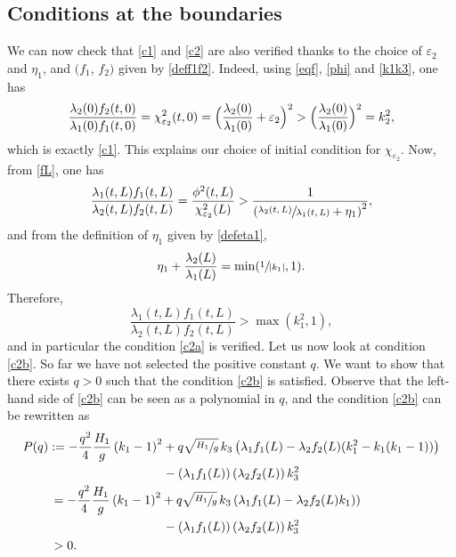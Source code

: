 \documentclass[JEP,XML,SOM,Unicode]{cedram}
\theoremstyle{definition}
\begin{document}
\subsection{Conditions at the boundaries}
We can now check that
\eqref{c1} and \eqref{c2} are also verified thanks to the choice of $\varepsilon_{2}$ and $\eta_{1}${, and $(f_{1}$, $f_{2})$ given by \eqref{deff1f2}}. Indeed, using \eqref{eqf}{, \eqref{phi}} and \eqref{k1k3}, one has
\begin{equation*}
\frac{\lambda_{2}(0)f_{2}(t,0)}{\lambda_{1}(0)f_{1}(t,0)}=\chi_{\varepsilon_{2}}^{2}(t,0)= \Bigl(\frac{\lambda_{2}(0)}{\lambda_{1}(0)}+\varepsilon_{2} \Bigr)^{2}> \Bigl(\frac{\lambda_{2}(0)}{\lambda_{1}(0)} \Bigr)^{2}=k_{2}^{2},
\end{equation*}
{which is exactly \eqref{c1}.} This explains our choice of initial condition for $\chi_{\varepsilon_{2}}$.
Now, from \eqref{fL}, one has
\begin{equation*}
\frac{\lambda_{1}(t,L)f_{1}(t,L)}{\lambda_{2}(t,L)f_{2}(t,L)}=\frac{\phi^{2}(t,L)}{\chi^{2}_{\varepsilon_{2}}(L)}>\frac{1}{\left(\sfrac{\lambda_{2}(t,L)}{\lambda_{1}(t,L)}+\eta_{1}\right)^{2}},
\end{equation*}
and from the definition of $\eta_{1}$ given by \eqref{defeta1},
\begin{equation*}
\eta_{1}+\frac{\lambda_{2}(L)}{\lambda_{1}(L)}=\min(\sfrac{1}{|k_{1}|},1).
\end{equation*}
Therefore,
\begin{equation}
\frac{\lambda_{1}(t,L)f_{1}(t,L)}{\lambda_{2}(t,L)f_{2}(t,L)}>\max(k_{1}^{2},1),
\label{cond3}
\end{equation}
and in particular
the condition \eqref{c2a} is verified. Let us now look at condition \eqref{c2b}. So far we have not selected the positive constant $q$.
We want to show that there exists $q>0$ such that the condition \eqref{c2b} is satisfied. Observe that the left-hand side of \eqref{c2b} can be seen as a polynomial in $q$,
and the condition \eqref{c2b} can be rewritten as
\begin{equation*}
\begin{split}
P(q)&:=
-\frac{q^{2}}{4}\frac{H_{1}}{g}\left(k_{1}-1\right)^{2}+q\sqrt{\sfrac{H_{1}}{g}}\,k_{3}\left(\lambda_{1}f_{1}(L)-\lambda_{2}f_{2}(L)(k_{1}^{2}-k_{1}(k_{1}-1))\right)
\\
&\hspace*{3.23cm}-\left(\lambda_{1}f_{1}(L)\right)\left(\lambda_{2}f_{2}(L)\right)k_{3}^{2}\\
&\,=-\frac{q^{2}}{4}\frac{H_{1}}{g}\left(k_{1}-1\right)^{2}+q\sqrt{\sfrac{H_{1}}{g}}\,k_{3}\left(\lambda_{1}f_{1}(L)-\lambda_{2}f_{2}(L)k_{1})\right)\\
&\hspace*{3.23cm}-\left(\lambda_{1}f_{1}(L)\right)\left(\lambda_{2}f_{2}(L)\right)k_{3}^{2}\\
&\,>0.
\end{split}
\end{equation*}
\end{document}
